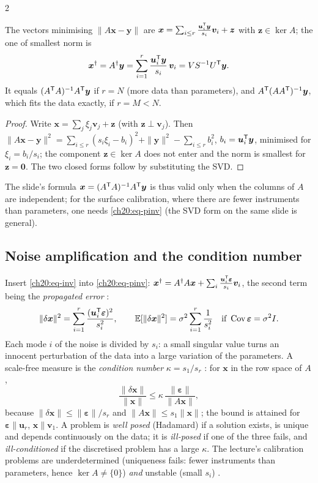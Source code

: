 \begin{paracol}{2}
\begin{proposition}\label{ch20:prop-pinv}
The vectors minimising $\|A\bm x-\bm y\|$ are $\bm x=\sum_{i\le r}\frac{\bm u_i^{\mathsf T}\bm y}{s_i}\bm v_i+\bm z$ with $\bm z\in\ker A$; the one of smallest norm is
\begin{equation}\label{ch20:eq-pinv}
  \bm x^\dagger=A^\dagger\bm y=\sum_{i=1}^r\frac{\bm u_i^{\mathsf T}\bm y}{s_i}\,\bm v_i=VS^{-1}U^{\mathsf T}\bm y .
\end{equation}
It equals $(A^{\mathsf T} A)^{-1}A^{\mathsf T}\bm y$ if $r=N$ (more data than parameters), and $A^{\mathsf T}(AA^{\mathsf T})^{-1}\bm y$, which fits the data exactly, if $r=M<N$.
\end{proposition}
\begin{proof}
Write $\bm x=\sum_j\xi_j\bm v_j+\bm z$ (with $\bm z\perp\bm v_j$). Then $\|A\bm x-\bm y\|^2=\sum_{i\le r}(s_i\xi_i-b_i)^2+\|\bm y\|^2-\sum_{i\le r}b_i^2$, $b_i=\bm u_i^{\mathsf T}\bm y$, minimised for $\xi_i=b_i/s_i$; the component $\bm z\in\ker A$ does not enter and the norm is smallest for $\bm z=\bm 0$.
The two closed forms follow by substituting the SVD.
\end{proof}
The slide's formula $\bm x=(A^{\mathsf T} A)^{-1}A^{\mathsf T}\bm y$ is thus valid only when the columns of $A$ are independent; for the surface calibration, where there are fewer instruments than parameters,
one needs \eqref{ch20:eq-pinv} (the SVD form on the same slide is general).

\subsection{Noise amplification and the condition number}\label{ch20:sec-noise}
Insert \eqref{ch20:eq-inv} into \eqref{ch20:eq-pinv}: $\bm x^\dagger=A^\dagger A\bm x+\sum_i\frac{\bm u_i^{\mathsf T}\bm\varepsilon}{s_i}\bm v_i$, the second term being the \emph{propagated error}
:
\[
  \|\delta\bm x\|^2=\sum_{i=1}^r\frac{(\bm u_i^{\mathsf T}\bm\varepsilon)^2}{s_i^2},\qquad
  \mathbb{E}[\|\delta\bm x\|^2]=\sigma^2\sum_{i=1}^r\frac1{s_i^2}\quad\text{if }\operatorname{Cov}\bm\varepsilon=\sigma^2I .
\]
Each mode $i$ of the noise is divided by $s_i$: a small singular value turns an innocent perturbation of the data into a large variation of the parameters. A scale-free measure is the
\emph{condition number} $\kappa=s_1/s_r$ : for $\bm x$ in the row space of $A$,
\[
  \frac{\|\delta\bm x\|}{\|\bm x\|}\le\kappa\,\frac{\|\bm\varepsilon\|}{\|A\bm x\|},
\]
because $\|\delta\bm x\|\le\|\bm\varepsilon\|/s_r$ and $\|A\bm x\|\le s_1\|\bm x\|$; the bound is attained for $\bm\varepsilon\parallel\bm u_r$, $\bm x\parallel\bm v_1$. A problem is \emph{well posed}
(Hadamard) if a solution exists, is unique and depends continuously on the data; it is \emph{ill-posed} if one of the three fails, and \emph{ill-conditioned} if the discretised problem has a large $\kappa$. The
lecture's calibration problems are underdetermined (uniqueness fails: fewer instruments than parameters, hence $\ker A\ne\{0\}$) \emph{and} unstable (small $s_i$)
.


\end{paracol}
